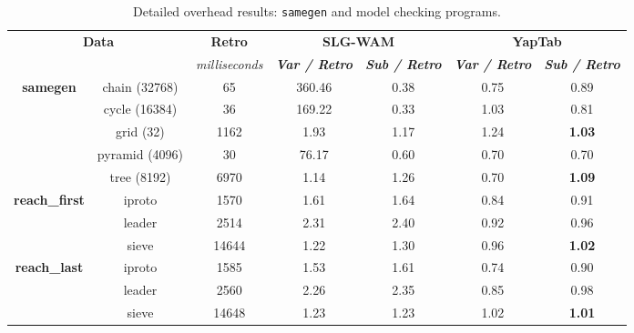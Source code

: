 \begin{table}[ht]
\centering
\footnotesize{
  \begin{tabular}{cc|c|cc|cc}
   \hline
    \hline
    \multicolumn{2}{c|}{\multirow{2}{*}{\small{\textbf{Data}}}} & \textbf{\small{Retro}} & \multicolumn{2}{c|}{\small{\textbf{SLG-WAM}}} & \multicolumn{2}{c}{\small{\textbf{YapTab}}} \\
     \multicolumn{2}{c|}{} & \scriptsize{\textit{milliseconds}} & \textbf{\textit{\scriptsize{Var / Retro}}} & \textbf{\textit{\scriptsize{Sub / Retro}}} & \textbf{\textit{\scriptsize{Var / Retro}}} & \textbf{\textit{\scriptsize{Sub / Retro}}} \\
   \hline
   \hline

   \multirow{5}{*}{\textbf{samegen}} &  chain  (32768)  &  65 &  360.46  &  0.38  &  0.75 &  0.89 \\
   &  cycle  (16384)  &  36 &  169.22  &  0.33  &  1.03 &  0.81 \\
   &  grid  (32)  &  1162 &  1.93  &  1.17  &  1.24 &  \textbf{1.03} \\
   &  pyramid  (4096)  &  30 &  76.17  &  0.60  &  0.70 &  0.70 \\
   &  tree  (8192)  &  6970 &  1.14  &  1.26  &  0.70 &  \textbf{1.09} \\
   \hline
   
   \multirow{3}{*}{\textbf{reach\_first}} &  iproto  &  1570 &  1.61  &  1.64  &  0.84 &  0.91 \\
   &  leader  &  2514 &  2.31  &  2.40  &  0.92 &  0.96 \\
   &  sieve  &  14644 &  1.22  &  1.30  &  0.96 &  \textbf{1.02} \\
   \hline
   \multirow{3}{*}{\textbf{reach\_last}} &  iproto  &  1585 &  1.53  &  1.61  &  0.74 &  0.90 \\
   &  leader  &  2560 &  2.26  &  2.35  &  0.85 &  0.98 \\
   &  sieve  &  14648 &  1.23  &  1.23  &  1.02 &  \textbf{1.01} \\

\hline
\end{tabular}
}
\caption{Detailed overhead results: \texttt{samegen} and model checking programs.}
\label{tbl:overhead_detail_model}
\end{table}